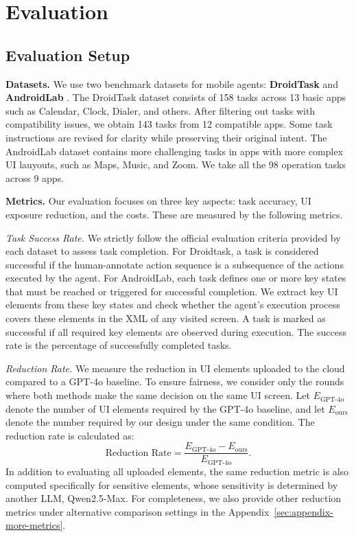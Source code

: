 \section{Evaluation}
\subsection{Evaluation Setup}
\textbf{Datasets.} We use two benchmark datasets for mobile agents: \textbf{DroidTask} \citep{wen2024autodroid} and \textbf{AndroidLab} \citep{xu2024androidlab}. The DroidTask dataset consists of 158 tasks across 13 basic apps such as Calendar, Clock, Dialer, and others. After filtering out tasks with compatibility issues, we obtain 143 tasks from 12 compatible apps. Some task instructions are revised for clarity while preserving their original intent. The AndroidLab dataset contains more challenging tasks in apps with more complex UI lauyouts, such as Maps, Music, and Zoom. We take all the 98 operation tasks across 9 apps. 

\textbf{Metrics.} Our evaluation focuses on three key aspects: task accuracy, UI exposure reduction, and the costs. These are measured by the following metrics.

\textit{Task Success Rate.} 
We strictly follow the official evaluation criteria provided by each dataset to assess task completion. For Droidtask, a task is considered successful if the human-annotate action sequence is a subsequence of the actions executed by the agent. For AndroidLab, each task defines one or more key states that must be reached or triggered for successful completion. We extract key UI elements from these key states and check whether the agent’s execution process covers these elements in the XML of any visited screen. A task is marked as successful if all required key elements are observed during execution. The success rate is the percentage of successfully completed tasks.

\textit{Reduction Rate.} 
We measure the reduction in UI elements uploaded to the cloud compared to a GPT-4o baseline. To ensure fairness, we consider only the rounds where both methods make the same decision on the same UI screen. Let $E_{\text{GPT-4o}}$ denote the number of UI elements required by the GPT-4o baseline, and let $E_{\text{ours}}$ denote the number required by our design under the same condition. The reduction rate is calculated as:
\begin{equation}
\text{Reduction Rate} = \frac{E_{\text{GPT-4o}} - E_{\text{ours}}}{E_{\text{GPT-4o}}}.
\end{equation}
In addition to evaluating all uploaded elements, the same reduction metric is also computed specifically for sensitive elements, whose sensitivity is determined by another LLM, Qwen2.5-Max.
For completeness, we also provide other reduction metrics under alternative comparison settings in the Appendix~\ref{sec:appendix-more-metrics}.

